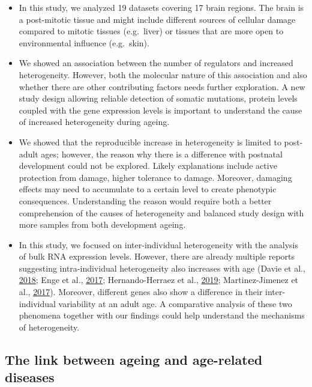 \documentclass[12pt,twoside]{unicam}
\providecommand{\tightlist}{%
  \setlength{\itemsep}{0pt}\setlength{\parskip}{0pt}}
\begin{document}
\begin{itemize}
\tightlist
\item
  In this study, we analyzed 19 datasets covering 17 brain regions. The brain is a post-mitotic tissue and might include different sources of cellular damage compared to mitotic tissues (e.g.~liver) or tissues that are more open to environmental influence (e.g.~skin).
\item
  We showed an association between the number of regulators and increased heterogeneity. However, both the molecular nature of this association and also whether there are other contributing factors needs further exploration. A new study design allowing reliable detection of somatic mutations, protein levels coupled with the gene expression levels is important to understand the cause of increased heterogeneity during ageing.
\item
  We showed that the reproducible increase in heterogeneity is limited to post-adult ages; however, the reason why there is a difference with postnatal development could not be explored. Likely explanations include active protection from damage, higher tolerance to damage. Moreover, damaging effects may need to accumulate to a certain level to create phenotypic consequences. Understanding the reason would require both a better comprehension of the causes of heterogeneity and balanced study design with more samples from both development ageing.
\item
  In this study, we focused on inter-individual heterogeneity with the analysis of bulk RNA expression levels. However, there are already multiple reports suggesting intra-individual heterogeneity also increases with age (Davie et al., \protect\hyperlink{ref-Davie2018}{2018}; Enge et al., \protect\hyperlink{ref-Enge2017}{2017}; Hernando-Herraez et al., \protect\hyperlink{ref-Hernando-Herraez2019}{2019}; Martinez-Jimenez et al., \protect\hyperlink{ref-Martinez-Jimenez2017}{2017}). Moreover, different genes also show a difference in their inter-individual variability at an adult age. A comparative analysis of these two phenomena together with our findings could help understand the mechanisms of heterogeneity.
\end{itemize}

\hypertarget{the-link-between-ageing-and-age-related-diseases}{%
\subsection{The link between ageing and age-related diseases}\label{the-link-between-ageing-and-age-related-diseases}}
\end{document}
